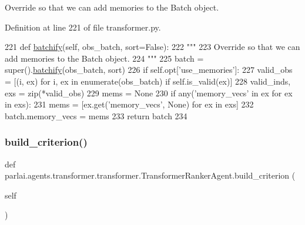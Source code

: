 \begin{DoxyVerb}Override so that we can add memories to the Batch object.
\end{DoxyVerb}
 

Definition at line 221 of file transformer.\+py.


\begin{DoxyCode}
221     \textcolor{keyword}{def }\hyperlink{namespaceparlai_1_1agents_1_1drqa_1_1utils_aca22dd97c5b6dcda2a7479c1cb22ef1e}{batchify}(self, obs\_batch, sort=False):
222         \textcolor{stringliteral}{"""}
223 \textcolor{stringliteral}{        Override so that we can add memories to the Batch object.}
224 \textcolor{stringliteral}{        """}
225         batch = super().\hyperlink{namespaceparlai_1_1agents_1_1drqa_1_1utils_aca22dd97c5b6dcda2a7479c1cb22ef1e}{batchify}(obs\_batch, sort)
226         \textcolor{keywordflow}{if} self.opt[\textcolor{stringliteral}{'use\_memories'}]:
227             valid\_obs = [(i, ex) \textcolor{keywordflow}{for} i, ex \textcolor{keywordflow}{in} enumerate(obs\_batch) \textcolor{keywordflow}{if} self.is\_valid(ex)]
228             valid\_inds, exs = zip(*valid\_obs)
229             mems = \textcolor{keywordtype}{None}
230             \textcolor{keywordflow}{if} any(\textcolor{stringliteral}{'memory\_vecs'} \textcolor{keywordflow}{in} ex \textcolor{keywordflow}{for} ex \textcolor{keywordflow}{in} exs):
231                 mems = [ex.get(\textcolor{stringliteral}{'memory\_vecs'}, \textcolor{keywordtype}{None}) \textcolor{keywordflow}{for} ex \textcolor{keywordflow}{in} exs]
232             batch.memory\_vecs = mems
233         \textcolor{keywordflow}{return} batch
234 
\end{DoxyCode}
\mbox{\label{classparlai_1_1agents_1_1transformer_1_1transformer_1_1TransformerRankerAgent_af91ef63ee5c7f7588a75e32587364c80}} 
\subsubsection{\texorpdfstring{build\+\_\+criterion()}{build\_criterion()}}
{\footnotesize\ttfamily def parlai.\+agents.\+transformer.\+transformer.\+Transformer\+Ranker\+Agent.\+build\+\_\+criterion (\begin{DoxyParamCaption}\item[{}]{self }\end{DoxyParamCaption})}

